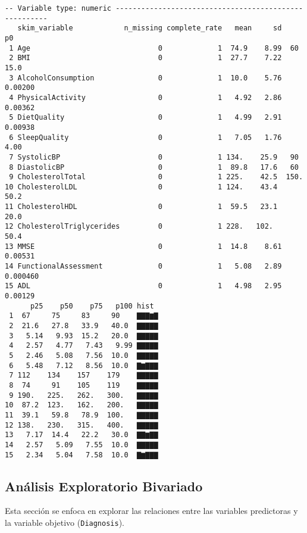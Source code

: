 \documentclass[
  letterpaper,
  DIV=11,
  numbers=noendperiod]{scrartcl}
\begin{document}
\begin{verbatim}
-- Variable type: numeric ------------------------------------------------------
   skim_variable            n_missing complete_rate   mean     sd         p0
 1 Age                              0             1  74.9    8.99  60       
 2 BMI                              0             1  27.7    7.22  15.0     
 3 AlcoholConsumption               0             1  10.0    5.76   0.00200 
 4 PhysicalActivity                 0             1   4.92   2.86   0.00362 
 5 DietQuality                      0             1   4.99   2.91   0.00938 
 6 SleepQuality                     0             1   7.05   1.76   4.00    
 7 SystolicBP                       0             1 134.    25.9   90       
 8 DiastolicBP                      0             1  89.8   17.6   60       
 9 CholesterolTotal                 0             1 225.    42.5  150.      
10 CholesterolLDL                   0             1 124.    43.4   50.2     
11 CholesterolHDL                   0             1  59.5   23.1   20.0     
12 CholesterolTriglycerides         0             1 228.   102.    50.4     
13 MMSE                             0             1  14.8    8.61   0.00531 
14 FunctionalAssessment             0             1   5.08   2.89   0.000460
15 ADL                              0             1   4.98   2.95   0.00129 
      p25    p50    p75   p100 hist 
 1  67     75     83     90    ▇▇▇▆▇
 2  21.6   27.8   33.9   40.0  ▇▇▇▇▇
 3   5.14   9.93  15.2   20.0  ▇▇▇▇▇
 4   2.57   4.77   7.43   9.99 ▇▇▇▇▇
 5   2.46   5.08   7.56  10.0  ▇▇▇▇▇
 6   5.48   7.12   8.56  10.0  ▇▆▇▇▇
 7 112    134    157    179    ▇▇▇▇▇
 8  74     91    105    119    ▇▇▇▇▇
 9 190.   225.   262.   300.   ▇▇▇▇▇
10  87.2  123.   162.   200.   ▇▇▇▇▇
11  39.1   59.8   78.9  100.   ▇▇▇▇▇
12 138.   230.   315.   400.   ▇▇▇▇▇
13   7.17  14.4   22.2   30.0  ▇▇▆▇▇
14   2.57   5.09   7.55  10.0  ▇▇▇▇▇
15   2.34   5.04   7.58  10.0  ▇▆▇▇▇
\end{verbatim}

\subsection{Análisis Exploratorio
Bivariado}\label{anuxe1lisis-exploratorio-bivariado}

Esta sección se enfoca en explorar las relaciones entre las variables
predictoras y la variable objetivo (\texttt{Diagnosis}).
\end{document}
